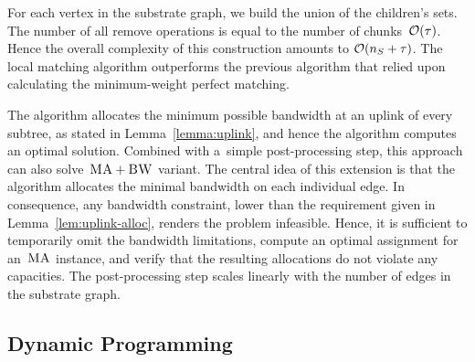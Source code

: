  For each
vertex in the substrate graph,
we build the union of the
children's sets.
The number of all remove operations is equal to
the number of chunks~$\mathcal{O}(\tau)$.
Hence the overall complexity of this construction amounts to
$\mathcal{O}(n_S + \tau)$.
The local matching algorithm outperforms the previous algorithm that relied upon calculating the minimum-weight perfect matching.


%

The algorithm allocates the minimum possible bandwidth at an uplink of every subtree, as stated in Lemma~\ref{lemma:uplink}, and hence the algorithm computes an optimal solution.
Combined with a~simple post-processing step, this approach can also solve~$\textsc{MA}+\textsc{BW}$ variant. The central idea of this extension is
that the algorithm allocates the minimal bandwidth
on each individual edge. In consequence, any bandwidth constraint,
lower than the requirement given in Lemma~\ref{lem:uplink-alloc}, renders
the problem infeasible. Hence, it is sufficient to temporarily omit the
bandwidth limitations, compute an optimal assignment for an~$\textsc{MA}$ instance, and
verify that the resulting allocations do not violate any capacities. The
post-processing step scales linearly with the number of edges in the substrate
graph.


\subsection{Dynamic Programming}\label{ssec:dyn}

